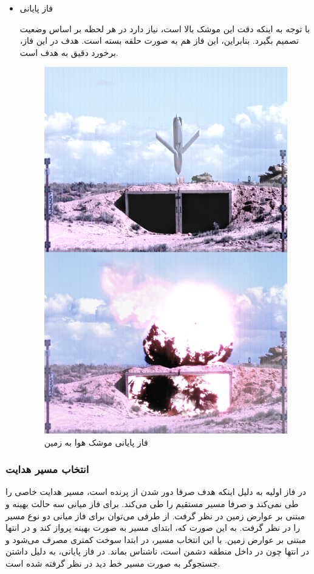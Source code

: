 \begin{itemize}
	\item فاز پایانی
	
	
	با توجه به اینکه دقت این موشک بالا است، نیاز دارد در هر لحظه بر اساس وضعیت تصمیم بگیرد. بنابراین، این فاز هم به صورت حلقه بسته است. هدف در این فاز، برخورد دقیق به هدف است.
			 \begin{figure}[H]
		\centering
		\includegraphics[width=0.75\linewidth]{../Figure/Q1/end.jpg}
		\caption{فاز پایانی موشک هوا به زمین
		}
	\end{figure}
\end{itemize}

\subsubsection{انتخاب مسیر هدایت}

در فاز اولیه به دلیل اینکه هدف صرفا دور شدن از پرنده است، مسیر هدایت خاصی را طی نمی‌کند و صرفا مسیر مستقیم را طی می‌کند. برای فاز میانی سه حالت بهینه و مبتنی بر عوارض زمین در نظر گرفت. از طرفی می‌توان برای فاز میانی دو نوع مسیر را در نظر گرفت. به این صورت که، ابتدای مسیر به صورت بهینه پرواز کند و در انتها مبتنی بر عوارض زمین. با این انتخاب مسیر، در ابتدا سوخت کمتری مصرف می‌شود و در انتها چون در داخل منطقه دشمن است، ناشناس بماند. در فاز پایانی، به دلیل داشتن جستجوگر به صورت مسیر خط دید در نظر گرفته شده است.
